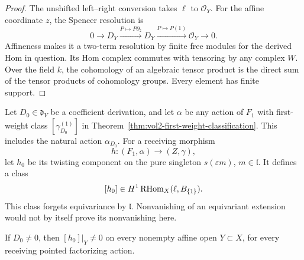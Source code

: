 \begin{proof}
The unshifted left--right conversion takes $\ell$ to $\mathcal O_Y$.
For the affine coordinate $z$, the Spencer resolution is
\[
 0\longrightarrow D_Y
 \xrightarrow{P\mapsto P\partial_z}D_Y
 \xrightarrow{P\mapsto P(1)}\mathcal O_Y\longrightarrow0.
\]
Affineness makes it a two-term resolution by finite free modules
for the derived Hom in question. Its Hom complex commutes with
tensoring by any complex $W$. Over the field $k$, the cohomology
of an algebraic tensor product is the direct sum of the tensor
products of cohomology groups. Every element has finite support.
\end{proof}

Let $D_0\in\mathfrak d_V$ be a coefficient derivation, and let
$\alpha$ be any action of $F_1$ with first-weight class
$[\gamma_{D_0}^{(1)}]$ in
Theorem~\ref{thm:vol2-first-weight-classification}.
This includes the natural action $\alpha_{D_0}$.
For a receiving morphism
\[
 h:(F_1,\alpha)\longrightarrow(Z,\gamma),
\]
let $h_0$ be its twisting component on the pure singleton
$s(\varepsilon m)$, $m\in\mathfrak l$.
It defines a class
\[
 [h_0]\in H^1\operatorname{RHom}_X(\ell,B_{\{1\}}).
\]
This class forgets equivariance by $\mathfrak l$.
Nonvanishing of an equivariant extension would not by itself
prove its nonvanishing here.

\begin{theorem}\label{thm:vol2-plain-singleton}
If $D_0\ne0$, then $[h_0]|_Y\ne0$ on every nonempty affine
open $Y\subset X$, for every receiving pointed factorizing action.
\end{theorem}

